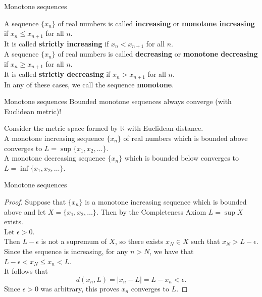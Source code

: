 \documentclass{beamer}
\begin{document}
\begin{frame}{Monotone sequences}
\begin{defn}
\pause
A sequence $\{x_n\}$ of real numbers is called \textbf{increasing} or \textbf{monotone increasing} if $x_n\leq x_{n+1}$ for all $n$.\\
\pause
It is called \textbf{strictly increasing} if $x_n < x_{n+1}$ for all $n$.\\
\pause
A sequence $\{x_n\}$ of real numbers is called \textbf{decreasing} or \textbf{monotone decreasing} if $x_n\geq x_{n+1}$ for all $n$.\\
\pause
It is called \textbf{strictly decreasing} if $x_n > x_{n+1}$ for all $n$.\\
\pause
In any of these cases, we call the sequence \textbf{monotone}.
\end{defn}
\end{frame}

\begin{frame}{Monotone sequences}
Bounded monotone sequences always converge (with Euclidean metric)!
\pause
\begin{thm}
\pause
Consider the metric space formed by $\mathbb{R}$ with Euclidean distance.\\
\pause
A monotone increasing sequence $\{x_n\}$ of real numbers which is bounded above converges to $L = \sup\{x_1,x_2,\dots\}$.\\
\pause
A monotone decreasing sequence $\{x_n\}$ which is bounded below converges to $L = \inf\{x_1,x_2,\dots\}$.
\end{thm}
\end{frame}

\begin{frame}{Monotone sequences}
\begin{proof}
\pause
Suppose that $\{x_n\}$ is a monotone increasing sequence which is bounded above and let $X = \{x_1,x_2,\dots\}$.
\pause
Then by the Completeness Axiom $L=\sup X$ exists.\\
\pause
Let $\epsilon > 0$.\\
\pause
Then $L-\epsilon$ is not a supremum of $X$, so there exists $x_N\in X$ such that $x_N > L-\epsilon$.\\
\pause
Since the sequence is increasing, for any $n >N$, we have that $L-\epsilon < x_N \leq x_n < L$.\\
\pause
It follows that
$$d(x_n,L) = |x_n-L| = L-x_n < \epsilon.$$
\pause
Since $\epsilon > 0$ was arbitrary, this proves $x_n$ converges to $L$.
\end{proof}
\end{frame}
\end{document}
